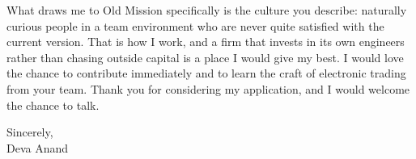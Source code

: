 \documentclass[letterpaper,11pt]{article}
\begin{document}
What draws me to Old Mission specifically is the culture you describe: naturally curious people in a team environment who are never quite satisfied with the current version. That is how I work, and a firm that invests in its own engineers rather than chasing outside capital is a place I would give my best. I would love the chance to contribute immediately and to learn the craft of electronic trading from your team. Thank you for considering my application, and I would welcome the chance to talk.

\vspace{6pt}

\noindent Sincerely,\\
Deva Anand
\end{document}
